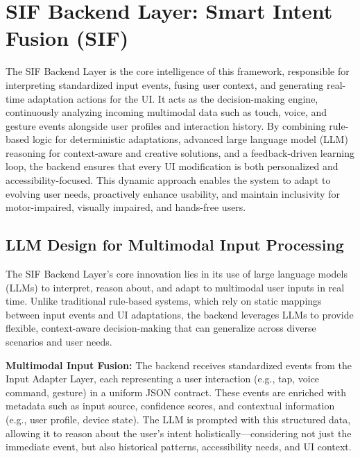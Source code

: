 \documentclass[openany]{book}
\begin{document}
\section{SIF Backend Layer: Smart Intent Fusion (SIF)}

The SIF Backend Layer is the core intelligence of this framework, responsible for interpreting standardized input events, fusing user context, and generating real-time adaptation actions for the UI. It acts as the decision-making engine, continuously analyzing incoming multimodal data such as touch, voice, and gesture events alongside user profiles and interaction history. By combining rule-based logic for deterministic adaptations, advanced large language model (LLM) reasoning for context-aware and creative solutions, and a feedback-driven learning loop, the backend ensures that every UI modification is both personalized and accessibility-focused. This dynamic approach enables the system to adapt to evolving user needs, proactively enhance usability, and maintain inclusivity for motor-impaired, visually impaired, and hands-free users.

\subsection{LLM Design for Multimodal Input Processing}

The SIF Backend Layer’s core innovation lies in its use of large language models (LLMs) to interpret, reason about, and adapt to multimodal user inputs in real time. Unlike traditional rule-based systems, which rely on static mappings between input events and UI adaptations, the backend leverages LLMs to provide flexible, context-aware decision-making that can generalize across diverse scenarios and user needs.

\textbf{Multimodal Input Fusion:}
The backend receives standardized events from the Input Adapter Layer, each representing a user interaction (e.g., tap, voice command, gesture) in a uniform JSON contract. These events are enriched with metadata such as input source, confidence scores, and contextual information (e.g., user profile, device state). The LLM is prompted with this structured data, allowing it to reason about the user’s intent holistically—considering not just the immediate event, but also historical patterns, accessibility needs, and UI context.
\end{document}
